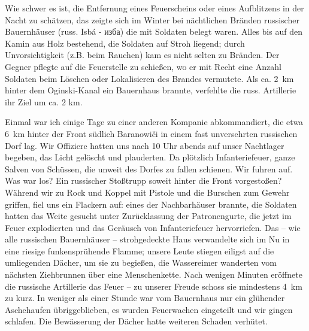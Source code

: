 \documentclass[a5paper,pagesize,10pt,twoside=true]{scrbook}
\newcommand\textcyr[1]{{\fontencoding{OT2}\fontfamily{wncyr}\selectfont #1}}	%
\begin{document}
Wie schwer es ist, die Entfernung eines Feuerscheins oder eines Aufblitzens in der Nacht zu schätzen, das zeigte sich im Winter bei nächtlichen Bränden russischer Bauernhäuser (russ. Isbá - \textcyr{изба}) die mit Soldaten belegt waren. Alles bis auf den Kamin aus Holz bestehend, die Soldaten auf Stroh liegend; durch Unvorsichtigkeit (z.B. beim Rauchen) kam es nicht selten zu Bränden. Der Gegner pflegte auf die Feuerstelle zu schießen, wo er mit Recht eine Anzahl Soldaten beim Löschen oder Lokalisieren des Brandes vermutete. Als ca. 2~km hinter dem Oginski-Kanal ein Bauernhaus brannte, verfehlte die russ. Artillerie ihr Ziel um ca. 2 km.

Einmal war ich einige Tage zu einer anderen Kompanie abkommandiert, die etwa 6~km hinter der Front südlich Baranowiči in einem fast unversehrten russischen Dorf lag. Wir Offiziere hatten uns nach 10 Uhr abends auf unser Nachtlager begeben, das Licht gelöscht und plauderten. Da plötzlich Infanteriefeuer, ganze Salven von Schüssen, die unweit des Dorfes zu fallen schienen. Wir fuhren auf. Was war los? Ein russischer Stoßtrupp soweit hinter die Front vorgestoßen? Während wir zu Rock und Koppel mit Pistole und die Burschen zum Gewehr griffen, fiel uns ein Flackern auf: eines der Nachbarhäuser brannte, die Soldaten hatten das Weite gesucht unter Zurücklassung der Patronengurte, die jetzt im Feuer explodierten und das Geräusch von Infanteriefeuer hervorriefen. Das -- wie alle russischen Bauernhäuser -- strohgedeckte Haus verwandelte sich im Nu in eine riesige funkensprühende Flamme; unsere Leute stiegen eiligst auf die umliegenden Dächer, um sie zu begießen, die Wassereimer wanderten vom nächsten Ziehbrunnen über eine Menschenkette. Nach wenigen Minuten eröffnete die russische Artillerie das Feuer -- zu unserer Freude schoss sie mindestens 4~km zu kurz. In weniger als einer Stunde war vom Bauernhaus nur ein glühender Aschehaufen übriggeblieben, es wurden Feuerwachen eingeteilt und wir gingen schlafen. Die Bewässerung der Dächer hatte weiteren Schaden verhütet.
\end{document}
